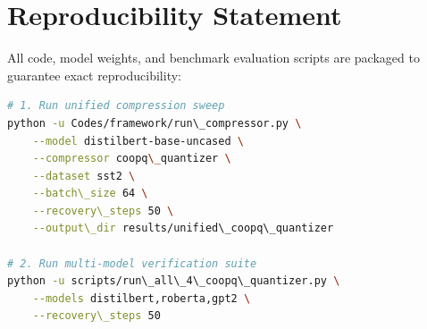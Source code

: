 \section{Reproducibility Statement}
All code, model weights, and benchmark evaluation scripts are packaged to guarantee exact reproducibility:
\begin{lstlisting}[language=bash]
# 1. Run unified compression sweep
python -u Codes/framework/run\_compressor.py \
    --model distilbert-base-uncased \
    --compressor coopq\_quantizer \
    --dataset sst2 \
    --batch\_size 64 \
    --recovery\_steps 50 \
    --output\_dir results/unified\_coopq\_quantizer

# 2. Run multi-model verification suite
python -u scripts/run\_all\_4\_coopq\_quantizer.py \
    --models distilbert,roberta,gpt2 \
    --recovery\_steps 50
\end{lstlisting}
